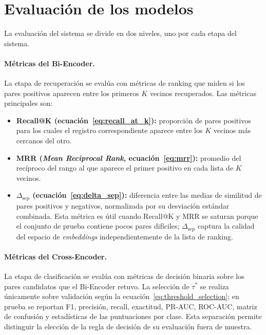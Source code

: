 \section{Evaluación de los modelos}

La evaluación del sistema se divide en dos niveles, uno por cada etapa del sistema.

\paragraph{Métricas del Bi-Encoder.}
La etapa de recuperación se evalúa con métricas de ranking que miden si los pares positivos aparecen entre los primeros $K$ vecinos recuperados. Las métricas principales son:

\begin{itemize}
    \item \textbf{Recall@K (ecuación~\ref{eq:recall_at_k}):} proporción de pares positivos para los cuales el registro correspondiente aparece entre los $K$ vecinos más cercanos del otro.
    \item \textbf{MRR (\textit{Mean Reciprocal Rank}, ecuación~\ref{eq:mrr}):} promedio del recíproco del rango al que aparece el primer positivo en cada lista de $K$ vecinos.
    \item \textbf{$\Delta_{\text{sep}}$ (ecuación~\ref{eq:delta_sep}):} diferencia entre las medias de similitud de pares positivos y negativos, normalizada por su desviación estándar combinada. Esta métrica es útil cuando Recall@K y MRR se saturan porque el conjunto de prueba contiene pocos pares difíciles; $\Delta_{\text{sep}}$ captura la calidad del espacio de \textit{embeddings} independientemente de la lista de ranking.
\end{itemize}

\paragraph{Métricas del Cross-Encoder.}
La etapa de clasificación se evalúa con métricas de decisión binaria sobre los pares candidatos que el Bi-Encoder retuvo. La selección de $\tau^*$ se realiza únicamente sobre validación según la ecuación~\ref{eq:threshold_selection}; en prueba se reportan F1, precisión, recall, exactitud, PR-AUC, ROC-AUC, matriz de confusión y estadísticas de las puntuaciones por clase. Esta separación permite distinguir la elección de la regla de decisión de su evaluación fuera de muestra.

